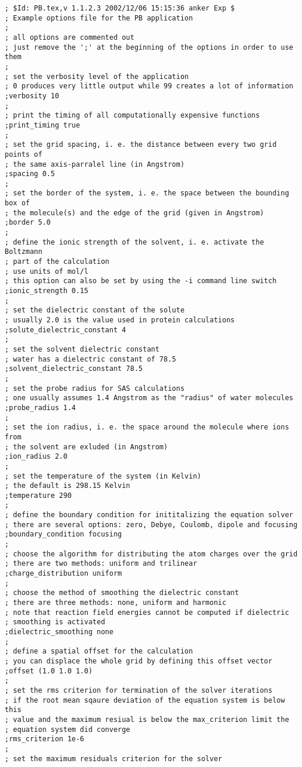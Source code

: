 \documentclass[12pt,twoside,a4paper]{article}
\begin{document}
\scriptsize
\begin{verbatim}
; $Id: PB.tex,v 1.1.2.3 2002/12/06 15:15:36 anker Exp $
; Example options file for the PB application
;
; all options are commented out
; just remove the ';' at the beginning of the options in order to use them
;
; set the verbosity level of the application 
; 0 produces very little output while 99 creates a lot of information
;verbosity 10 
;
; print the timing of all computationally expensive functions
;print_timing true
;
; set the grid spacing, i. e. the distance between every two grid points of
; the same axis-parralel line (in Angstrom)
;spacing 0.5
;
; set the border of the system, i. e. the space between the bounding box of
; the molecule(s) and the edge of the grid (given in Angstrom)
;border 5.0
;
; define the ionic strength of the solvent, i. e. activate the Boltzmann
; part of the calculation
; use units of mol/l
; this option can also be set by using the -i command line switch
;ionic_strength 0.15
;
; set the dielectric constant of the solute
; usually 2.0 is the value used in protein calculations
;solute_dielectric_constant 4
;
; set the solvent dielectric constant
; water has a dielectric constant of 78.5
;solvent_dielectric_constant 78.5
;
; set the probe radius for SAS calculations
; one usually assumes 1.4 Angstrom as the "radius" of water molecules
;probe_radius 1.4
;
; set the ion radius, i. e. the space around the molecule where ions from
; the solvent are exluded (in Angstrom)
;ion_radius 2.0
;
; set the temperature of the system (in Kelvin)
; the default is 298.15 Kelvin
;temperature 290
;
; define the boundary condition for inititalizing the equation solver
; there are several options: zero, Debye, Coulomb, dipole and focusing
;boundary_condition focusing
;
; choose the algorithm for distributing the atom charges over the grid
; there are two methods: uniform and trilinear
;charge_distribution uniform
;
; choose the method of smoothing the dielectric constant
; there are three methods: none, uniform and harmonic
; note that reaction field energies cannot be computed if dielectric
; smoothing is activated
;dielectric_smoothing none
;
; define a spatial offset for the calculation
; you can displace the whole grid by defining this offset vector
;offset (1.0 1.0 1.0)
;
; set the rms criterion for termination of the solver iterations
; if the root mean sqaure deviation of the equation system is below this
; value and the maximum resiual is below the max_criterion limit the
; equation system did converge
;rms_criterion 1e-6
;
; set the maximum residuals criterion for the solver

\end{verbatim}
\end{document}
